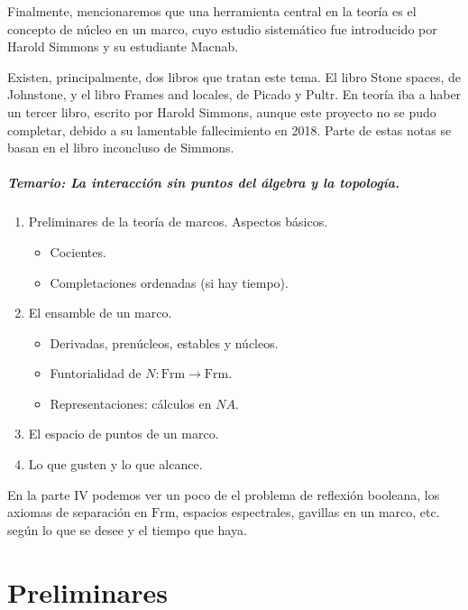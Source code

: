 \documentclass[12pt,letterpaper,titlepage]{article}
\theoremstyle{definition}
\newcommand\<{\langle}
\renewcommand\>{\rangle}
\newcommand{\Frm}{\mathrm{Frm}}
\begin{document}
Finalmente, mencionaremos que una herramienta central
en la teoría es el concepto de núcleo en un marco,
cuyo estudio sistemático fue introducido por Harold Simmons
y su estudiante Macnab.

Existen, principalmente, dos libros que tratan este tema.
El libro Stone spaces, de Johnstone,
y el libro Frames and locales, de Picado y Pultr.
En teoría iba a haber un tercer libro, escrito por Harold Simmons,
aunque este proyecto no se pudo completar, debido a su
lamentable fallecimiento en 2018.
Parte de estas notas se basan en el libro inconcluso de Simmons.

\subsubsection*{Temario: La interacción sin puntos del álgebra y la topología.}
\begin{enumerate}[label=\Roman*.]
  \item Preliminares de la teoría de marcos. Aspectos básicos.
  \begin{itemize}
      \item Cocientes.
      \item Completaciones ordenadas (si hay tiempo).
  \end{itemize}
  \item El ensamble de un marco.
  \begin{itemize}
      \item Derivadas, prenúcleos, estables y núcleos.
      \item Funtorialidad de $N:\Frm\to\Frm$.
      \item Representaciones: cálculos en $NA$.
  \end{itemize}
  \item El espacio de puntos de un marco.
  \item Lo que gusten y lo que alcance.
\end{enumerate}

En la parte IV podemos ver un poco de el problema de reflexión
booleana, los axiomas de
separación en $\Frm$, espacios espectrales, gavillas en un marco,
etc. según lo que se desee y el tiempo que haya.

\newpage
\tableofcontents
\listoftodos

\part{Preliminares}
\end{document}
